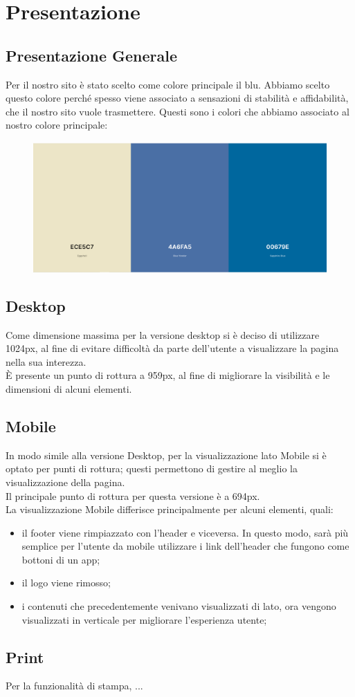 \section{Presentazione}

  \subsection{Presentazione Generale}
    Per il nostro sito è stato scelto come colore principale il blu. Abbiamo scelto questo colore perché spesso viene associato a sensazioni di stabilità e affidabilità, che il nostro sito vuole trasmettere. 
    Questi sono i colori che abbiamo associato al nostro colore principale:
    \begin{figure}[h]
      \includegraphics[scale=0.4]{Images/ColoriPaginaWeb.png}
      \centering
    \end{figure}

  \subsection{Desktop}
    Come dimensione massima per la versione desktop si è deciso di utilizzare 1024px, al fine di evitare difficoltà da parte dell'utente a visualizzare la pagina nella sua interezza. \\
    È presente un punto di rottura a 959px, al fine di migliorare la visibilità e le dimensioni di alcuni elementi.

  \subsection{Mobile}
    In modo simile alla versione Desktop, per la visualizzazione lato Mobile si è optato per punti di rottura; questi permettono di gestire al meglio la visualizzazione della pagina. \\
    Il principale punto di rottura per questa versione è a 694px. \\
    La visualizzazione Mobile differisce principalmente per alcuni elementi, quali:
    \begin{itemize}
      \item il footer viene rimpiazzato con l'header e viceversa. In questo modo, sarà più semplice per l'utente da mobile utilizzare i link dell'header che fungono come bottoni di un app;
      \item il logo viene rimosso;
      \item i contenuti che precedentemente venivano visualizzati di lato, ora vengono visualizzati in verticale per migliorare l'esperienza utente;
    \end{itemize}
  \subsection{Print}
    Per la funzionalità di stampa, ...
